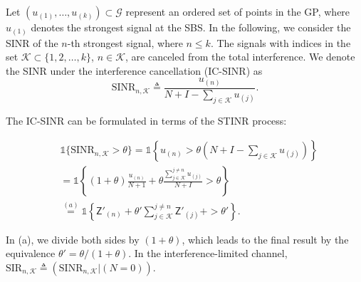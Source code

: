 \documentclass[lettersize,journal]{IEEEtran}
\begin{document}
Let $(u_{(1)}, \dots, u_{(k)}) \subset \mathcal{G}$ represent an ordered set of points in the GP, where $u_{(1)}$ denotes the strongest signal at the SBS. In the following, we consider the SINR of the $n$-th strongest signal, where $n \leq k$. The signals with indices in the set $\mathcal{K} \subset \{1, 2, \dots, k\}$, $n \in \mathcal{K}$, are canceled from the total interference. We denote the SINR under the interference cancellation (IC-SINR) as
\begin{equation}
  \text{SINR}_{n,\mathcal{K}} \triangleq \frac{u_{(n)}}{N+I-\sum_{j \in \mathcal{K} } u_{(j)}}.
\end{equation}


The IC-SINR can be formulated in terms of the STINR process:


\begin{align}
  \label{eq:IC-SINRcond}
   & \mathds{1}\{\text{SINR}_{n,\mathcal{K}} > \theta \} = \mathds{1} \left\{ u_{(n)} >\theta\left(N+I-  \sum_{j \in \mathcal{K}} u_{(j)}\right)\right\} \nonumber\\
  &\overset{}{=}\mathds{1} \left\{(1+\theta) \frac{u_{(n)}}{N+1}+ \theta \frac{\sum^{j\neq n}_{j\in \mathcal{K}} u_{(j)}}{N+I}>\theta \right\} \nonumber \\
  &\overset{(a)}{=} \mathds{1} \left\{ \mathsf{Z}'_{(n)}+\theta'\sum^{j\neq n}_{j\in \mathcal{K}}\mathsf{Z}'_{(j)} +>\theta'\right\}.
\end{align}


In (a), we divide both sides by $(1+\theta)$, which leads to the final result by the equivalence $\theta' = \theta/(1+\theta)$. In the interference-limited channel, $\text{SIR}_{n,\mathcal{K}} \triangleq (\text{SINR}_{n,\mathcal{K}}|(N=0))$.
\end{document}
